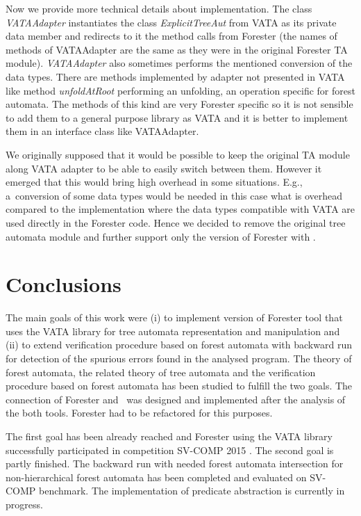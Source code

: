 \documentclass[fleqn,11pt]{ExcelAtFIT} %
\begin{document}
Now we provide more technical details about implementation.
The class \emph{VATAAdapter} instantiates the class \emph{ExplicitTreeAut} from VATA as its private data member
and redirects to it the method calls from Forester (the names of methods of VATAAdapter are the same as they were
in the original Forester TA module).
\emph{VATAAdapter} also sometimes performs the mentioned conversion of the data types.
There are methods implemented by adapter not presented in VATA like method \emph{unfoldAtRoot}
performing an unfolding, an operation specific for forest automata.
The methods of this kind are very Forester specific so it is not sensible to add them to a general purpose library as VATA
and it is better to implement them in an interface class like VATAAdapter.

We originally supposed that it would be possible to keep the original TA module along VATA adapter
to be able to easily switch between them.
However it emerged that this would bring high overhead in some situations.
E.g., a~conversion of some data types would be needed in this case
what is overhead compared to the implementation where the data types compatible with VATA are used directly in the Forester code.
Hence we decided to remove the original tree automata module and further support only the version of Forester with \vata.

\section{Conclusions}
\label{sec:concl}

The main goals of this work were (i) to implement version of Forester tool that uses the VATA library for tree automata representation and manipulation
and (ii) to extend verification procedure based on forest automata with backward run for detection of the spurious errors found in the analysed program.
The theory of forest automata, the related theory of tree automata and the verification procedure based on forest automata has been studied to fulfill the two goals.
The connection of Forester and \vata\ was designed and implemented after the analysis of the both tools.
Forester had to be refactored for this purposes.

The first goal has been already reached and Forester using the VATA library successfully participated in competition SV-COMP 2015 \cite{www:svcomp}.
The second goal is partly finished.
The backward run with needed forest automata intersection for non-hierarchical forest automata has been completed and evaluated on SV-COMP benchmark.
The implementation of predicate abstraction is currently in progress.
\end{document}
